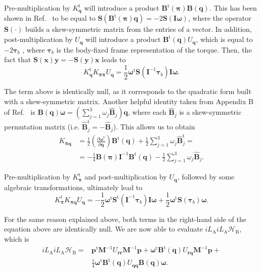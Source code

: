 \documentclass[
	aip,
	jcp,
	reprint,
]{revtex4-1}
\newcommand{\mt}[1]{\boldsymbol{\mathbf{#1}}}          %
\newcommand{\vt}[1]{\boldsymbol{\mathbf{#1}}}          %
\newcommand{\tr}[1]{#1^\text{t}}                       %
\newcommand{\diff}[2]{\frac{\partial #1}{\partial #2}} %
\newcommand{\Ham}[1]{{\mathcal H}_\text{#1}}           %
\newcommand{\Liu}[1]{i\!L_\text{#1}}                   %
\begin{document}
Pre-multiplication by $\tr{K_{\vt q}}$ will introduce a product $\tr{\mt B}(\vt \pi) {\mt B}(\vt q)$.
This has been shown in Ref.~ to be equal to ${\mt S}\left( \tr{\mt B}(\vt \pi) {\vt q} \right) = -2 {\mt S}({\mt I} {\vt \omega})$, where the operator ${\mt S}(\cdot)$ builds a skew-symmetric matrix from the entries of a vector.
In addition, post-multiplication by $U_{\vt q}$ will introduce a product $\tr{\mt B}(\vt q) U_{\vt q}$, which is equal to $-2 {\vt \tau}_b$ \cite{Silveira_2017}, where ${\vt \tau}_b$ is the body-fixed frame representation of the torque.
Then, the fact that ${\mt S}(\vt x) {\vt y} = -{\mt S}(\vt y) {\vt x}$ leads to
\begin{equation*}
\tr{K_{\vt q}} K_{\vt \pi \vt \pi} U_{\vt q} = \frac{1}{2} \tr{\vt \omega} {\mt S}({\mt I}^{-1} {\vt \tau}_b) {\mt I} {\vt \omega}.
\end{equation*}

The term above is identically null, as it corresponds to the quadratic form built with a skew-symmetric matrix.
Another helpful identity taken from Appendix B of Ref.~ is ${\mt B}(\vt q){\vt \omega} = ( \sum_{j=1}^3 \omega_j \hat{\mt B}_j ) \vt q$, where each $\hat{\mt B}_j$ is a skew-symmetric permutation matrix (i.e. $\tr{\hat{\mt B}}_j = -\hat{\mt B}_j$).
This allows us to obtain
\begin{align*}
K_{\vt \pi \vt q} &= \frac{1}{2} \left(\diff{\tr{\vt \omega}}{\vt q}\right) \tr{\mt B}(\vt q) + \frac{1}{2} \sum_{j=1}^3 \omega_j \tr{\hat{\mt B}}_j = \\
&= -\frac{1}{4} {\mt B}(\vt \pi) {\mt I}^{-1} \tr{\mt B}(\vt q) - \frac{1}{2} \sum_{j=1}^3 \omega_j \hat{\mt B}_j.
\end{align*}

Pre-multiplication by $\tr{K_{\vt \pi}}$ and post-multiplication by $U_{\vt q}$, followed by some algebraic transformations, ultimately lead to
\begin{equation*}
\tr{K_{\vt \pi}} K_{\vt \pi \vt q} U_{\vt q} = -\frac{1}{2} \tr{\vt \omega} \tr{\mt S}({\mt I}^{-1} {\vt \tau}_b) {\mt I} {\vt \omega} + \frac{1}{2} \tr{\vt \omega} {\mt S}({\vt \tau}_b){\vt \omega}.
\end{equation*}

For the same reason explained above, both terms in the right-hand side of the equation above are identically null.
We are now able to evaluate $\Liu A \Liu A \Ham B $, which is
\begin{align*}
\Liu A \Liu A \Ham B = &\tr{\vt p} {\mt M}^{-1} U_{\vt r \vt r} {\mt M}^{-1} {\vt p} + \tr{\vt \omega} \tr{\mt B}(\vt q) U_{\vt r \vt q} {\mt M}^{-1} {\vt p}
+ \\
&\frac{1}{4} \tr{\vt \omega} \tr{\mt B}(\vt q) U_{\vt q \vt q} {\mt B}(\vt q) \vt \omega.
\end{align*}
\end{document}
